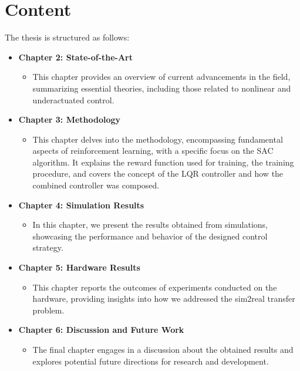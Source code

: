 \section{Content}
The thesis is structured as follows:

\begin{itemize}
  \item \textbf{Chapter 2: State-of-the-Art}
  \begin{itemize}
    \item This chapter provides an overview of current advancements in the field, summarizing essential theories, including those related to nonlinear and underactuated control.
  \end{itemize}
  
  \item \textbf{Chapter 3: Methodology}
  \begin{itemize}
    \item This chapter delves into the methodology, encompassing fundamental aspects of reinforcement learning, with a specific focus on the SAC algorithm. It explains the reward function used for training, the training procedure, and covers the concept of the LQR controller and how the combined controller was composed.
  \end{itemize}
  
  \item \textbf{Chapter 4: Simulation Results}
  \begin{itemize}
    \item In this chapter, we present the results obtained from simulations, showcasing the performance and behavior of the designed control strategy.
  \end{itemize}
  
  \item \textbf{Chapter 5: Hardware Results}
  \begin{itemize}
    \item This chapter reports the outcomes of experiments conducted on the hardware, providing insights into how we addressed the sim2real transfer problem.
  \end{itemize}
  
  \item \textbf{Chapter 6: Discussion and Future Work}
  \begin{itemize}
    \item The final chapter engages in a discussion about the obtained results and explores potential future directions for research and development.
  \end{itemize}
\end{itemize}

\cleardoublepage
